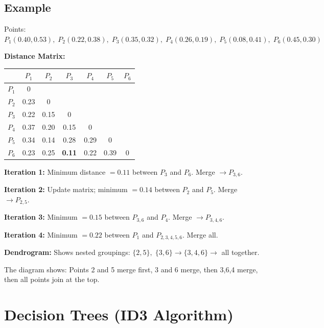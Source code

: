 \documentclass[12pt,a4paper]{article}
\begin{document}
\subsection{Example}

\begin{examplebox}
Points: $P_1(0.40,0.53),\; P_2(0.22,0.38),\; P_3(0.35,0.32),\; P_4(0.26,0.19),\; P_5(0.08,0.41),\; P_6(0.45,0.30)$

\textbf{Distance Matrix:}
\begin{center}
\begin{tabular}{ccccccc}
\toprule
 & $P_1$ & $P_2$ & $P_3$ & $P_4$ & $P_5$ & $P_6$ \\
\midrule
$P_1$ & 0    &      &       &       &       &       \\
$P_2$ & 0.23 & 0    &       &       &       &       \\
$P_3$ & 0.22 & 0.15 & 0     &       &       &       \\
$P_4$ & 0.37 & 0.20 & 0.15  & 0     &       &       \\
$P_5$ & 0.34 & 0.14 & 0.28  & 0.29  & 0     &       \\
$P_6$ & 0.23 & 0.25 & \textbf{0.11} & 0.22 & 0.39 & 0     \\
\bottomrule
\end{tabular}
\end{center}

\textbf{Iteration 1:} Minimum distance $= 0.11$ between $P_3$ and $P_6$. Merge $\to P_{3,6}$.

\textbf{Iteration 2:} Update matrix; minimum $= 0.14$ between $P_2$ and $P_5$. Merge $\to P_{2,5}$.

\textbf{Iteration 3:} Minimum $= 0.15$ between $P_{3,6}$ and $P_4$. Merge $\to P_{3,4,6}$.

\textbf{Iteration 4:} Minimum $= 0.22$ between $P_1$ and $P_{2,3,4,5,6}$. Merge all.

\textbf{Dendrogram:} Shows nested groupings: $\{2,5\},\;\{3,6\} \to \{3,4,6\} \to$ all together.

The diagram shows: Points 2 and 5 merge first, 3 and 6 merge, then 3,6,4 merge, then all points join at the top.
\end{examplebox}

\section{Decision Trees (ID3 Algorithm)}
\end{document}
